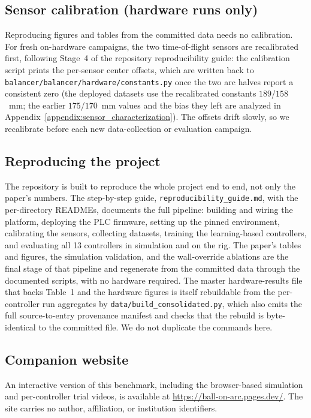 \subsection{Sensor calibration (hardware runs only)}

Reproducing figures and tables from the committed data needs no calibration.
For fresh on-hardware campaigns, the two time-of-flight sensors are
recalibrated first, following Stage~4 of the repository reproducibility guide:
the calibration script prints the per-sensor center offsets, which are
written back to \texttt{balancer/balancer/hardware/constants.py} once the two arc
halves report a consistent zero (the deployed datasets use the recalibrated
constants $189$/$158$~mm; the earlier $175$/$170$~mm values and the bias
they left are analyzed in
Appendix~\ref{appendix:sensor_characterization}). The offsets drift slowly, so we recalibrate before each new
data-collection or evaluation campaign.

\subsection{Reproducing the project}

The repository is built to reproduce the whole project end to end, not only
the paper's numbers. The step-by-step guide, \texttt{reproducibility\_guide.md},
with the per-directory READMEs, documents the full pipeline: building and
wiring the platform, deploying the PLC firmware, setting up the pinned
environment, calibrating the sensors, collecting datasets, training the
learning-based controllers, and evaluating all 13 controllers in simulation
and on the rig. The paper's tables and figures, the simulation validation,
and the wall-override ablations are the final stage of that pipeline and
regenerate from the committed data through the documented scripts, with no
hardware required. The master hardware-results file that backs Table~1 and the
hardware figures is itself rebuildable from the per-controller run aggregates
by \texttt{data/build\_consolidated.py}, which also emits the full
source-to-entry provenance manifest and checks that the rebuild is
byte-identical to the committed file. We do not duplicate the commands here.

\subsection{Companion website}

An interactive version of this benchmark, including the browser-based
simulation and per-controller trial videos, is available at
\url{https://ball-on-arc.pages.dev/}. The site carries no author,
affiliation, or institution identifiers.

